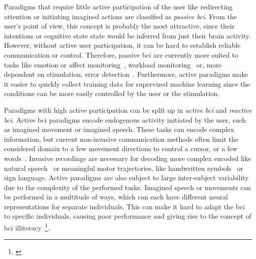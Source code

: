 
Paradigms that require little active participation of the user like
redirecting attention or initiating imagined actions are classified as \emph{passive
\ac{bci}}.
From the user's point of view, this concept is probably the most attractive,
since their intentions or cognitive state state would be inferred from just
their brain activity.
However, without active user participation, it can be hard to establish reliable
communication or control.
Therefore, passive \ac{bci} are currently more suited to tasks like
emotion or affect monitoring~\cite{Torres2020,Libert2019}, workload
monitoring~\cite{Zanetti2021} or, more dependent on stimulation, error
detection~\cite{SiMohammed2020}.
Furthermore, active paradigms make it easier to quickly collect training data for
supervized machine learning since the conditions can be more easily controlled
by the user or the stimulation.

Paradigms with high active participation can be split up in \emph{active
\ac{bci}} and \emph{reactive \ac{bci}}.
Active \ac{bci} paradigms encode endogenous activity initiated by the user,
such as imagined movement or imagined speech.
These tasks can encode complex information, but current non-invasive
communication methods often limit the considered domain to a few movement
directions to control a cursor, or a few words~\cite{Panachakel2021}.
Invasive recordings are necessary for decoding more complex encoded
like natural speech~\cite{Metzger2023} or meaningful motor trajectories, like handwritten
symbols~\cite{Willett2021} or sign language.
Active paradigms are also subject to large inter-subject variability due to the
complexity of the performed tasks.
Imagined speech or movements can be performed in a multitude of ways, which
can each have different neural representations for separate individuals.
This can make it hard to adapt the \ac{bci} to specific individuals, causing
poor performance and giving rise to the concept of \ac{bci}
illiteracy~\cite{Allison2010}\footnote{
  \cite{Becker2022,Thompson2019}
}.


